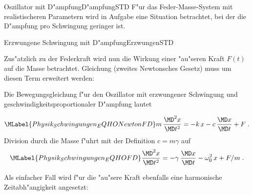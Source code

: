 \begin{MXContent}{Oszillator mit D"ampfung}{D"ampfung}{STD}
F"ur das Feder-Masse-System mit realistischeren Parametern wird in Aufgabe
eine Situation betrachtet, bei der die D"ampfung pro Schwingung geringer ist.

\end{MXContent}


\begin{MXContent}{Erzwungene Schwingung mit D"ampfung}{Erzwungen}{STD}%

Zus"atzlich zu der Federkraft wird nun die Wirkung einer "au"seren Kraft $F(t)$ auf die Masse betrachtet. Gleichung  (zweites Newtonsches Gesetz) muss um diesen Term erweitert werden:

\begin{MInfo}
Die Bewegungsgleichung f"ur den Oszillator mit erzwungener Schwingung und geschwindigkeitsproportionaler D"ampfung lautet

\begin{equation}\MLabel{Physik_Schwingungen_EQHONewtonFD}
  m\, \frac{\MD^2 x }{\MD t^2} = -k\,x -c\, \frac{\MD x }{\MD t} +  F  \; .
\end{equation}
Division durch die Masse f"uhrt mit der Definition $c=m\gamma$ auf
\begin{equation}\MLabel{Physik_Schwingungen_EQHOFD}
  \frac{\MD^2 x }{\MD t^2} = - \gamma \, \frac{\MD x }{\MD t} - \omega_0^2\,x +  F/m  \; .
\end{equation}

\end{MInfo}


Als einfacher Fall wird f"ur die "au"sere Kraft ebenfalls eine harmonische Zeitabh"angigkeit angesetzt:


\end{MXContent}
